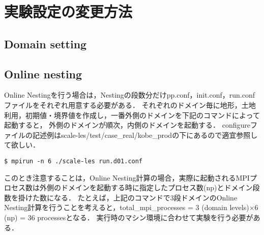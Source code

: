 \section{実験設定の変更方法}
\subsection{Domain setting}

\subsection{Online nesting}

Online Nestingを行う場合は，Nestingの段数分だけpp.conf，init.conf，run.confファイルをそれぞれ用意する必要がある．
それぞれのドメイン毎に地形，土地利用，初期値・境界値を作成し，一番外側のドメインを下記のコマンドによって起動すると，
外側のドメインが順次，内側のドメインを起動する．
configureファイルの記述例はscale-les/test/case\_real/kobe\_prodの下にあるので適宜参照して欲しい．
\begin{verbatim}
$ mpirun -n 6 ./scale-les run.d01.conf
\end{verbatim}
このとき注意することは，Online Nesting計算の場合，実際に起動されるMPIプロセス数は外側のドメインを起動する時に指定したプロセス数(np)とドメイン段数を掛けた数になる．
たとえば，上記のコマンドで3段ドメインのOnline Nesting計算を行うことを考えると，total\_mpi\_processes = 3 (domain levels)×6 (np) = 36 processesとなる．
実行時のマシン環境に合わせて実験を行う必要がある．

